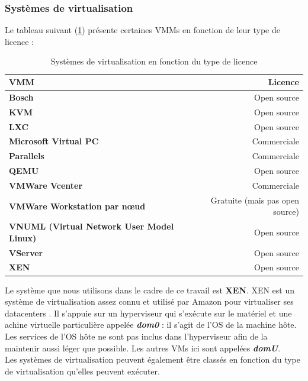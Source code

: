 \subsubsection{Systèmes de virtualisation}
Le tableau suivant (\ref{tab:sytemes_virtualisation}) présente certaines \acs{VMM}s en fonction de leur type de licence :
\begin{table}[H]
  \begin{center}
    \caption{Systèmes de virtualisation en fonction du type de licence}
    \begin{tabular}{>{\bfseries}l r}
      \hline
      \textbf{VMM} & \textbf{Licence} \\
      \hline
      Bosch & Open source \\ 
      KVM & Open source \\ 
      LXC & Open source \\ 
      Microsoft Virtual PC & Commerciale \\ 
      Parallels & Commerciale \\
      QEMU & Open source \\ 
      VMWare Vcenter & Commerciale \\ 
      VMWare Workstation par nœud & Gratuite (mais pas open source) \\ 
      VNUML (Virtual Network User Model Linux) & Open source \\
      VServer & Open source \\ 
      XEN & Open source \\ \hline
    \end{tabular}
    \label{tab:sytemes_virtualisation}
  \end{center}
\end{table}

Le système que nous utilisons dans le cadre de ce travail est \textbf{XEN}. XEN est un système de virtualisation assez connu \cite{article2} et utilisé par Amazon pour virtualiser ses datacenters \cite{online3}. Il s'appuie sur un hyperviseur qui s'exécute sur le matériel et une achine virtuelle particulière appelée \textit{\textbf{dom0}} : il s'agit de l'OS de la machine hôte. Les services de l'OS hôte ne sont pas inclus dans l'hyperviseur afin de la maintenir aussi léger que possible. Les autres VMs ici sont appelées \textit{\textbf{domU}}.\\
Les systèmes de virtualisation peuvent également être classés en fonction du type de virtualisation qu'elles peuvent exécuter.

